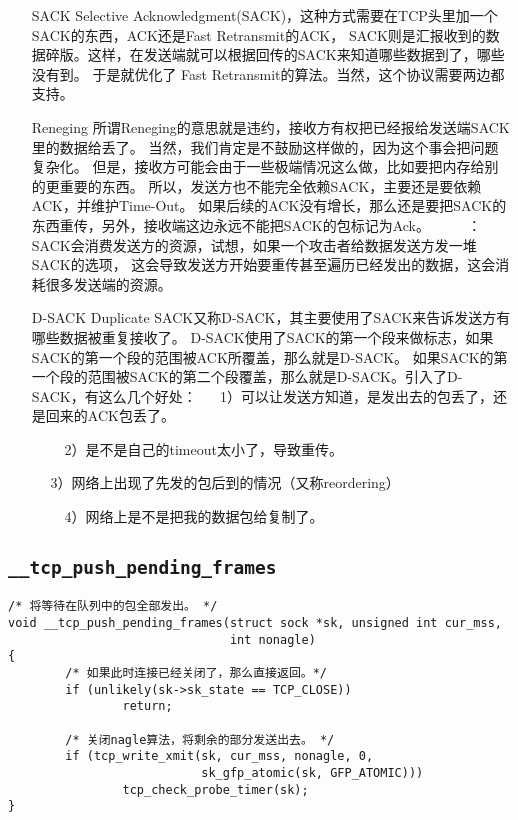 \begin{enumerate}
\item[SACK]			Selective Acknowledgment(SACK)，这种方式需要在TCP头里加一个SACK的东西，ACK还是Fast Retransmit的ACK，
					SACK则是汇报收到的数据碎版。这样，在发送端就可以根据回传的SACK来知道哪些数据到了，哪些没有到。
					于是就优化了 Fast Retransmit的算法。当然，这个协议需要两边都支持。
\item[Reneging]		所谓Reneging的意思就是违约，接收方有权把已经报给发送端SACK里的数据给丢了。
					当然，我们肯定是不鼓励这样做的，因为这个事会把问题复杂化。
					但是，接收方可能会由于一些极端情况这么做，比如要把内存给别的更重要的东西。
					所以，发送方也不能完全依赖SACK，主要还是要依赖ACK，并维护Time-Out。
					如果后续的ACK没有增长，那么还是要把SACK的东西重传，另外，接收端这边永远不能把SACK的包标记为Ack。
　　					\color{red}{注意}：SACK会消费发送方的资源，试想，如果一个攻击者给数据发送方发一堆SACK的选项，
					这会导致发送方开始要重传甚至遍历已经发出的数据，这会消耗很多发送端的资源。

\item[D-SACK]		Duplicate SACK又称D-SACK，其主要使用了SACK来告诉发送方有哪些数据被重复接收了。
					D-SACK使用了SACK的第一个段来做标志，如果SACK的第一个段的范围被ACK所覆盖，那么就是D-SACK。
					如果SACK的第一个段的范围被SACK的第二个段覆盖，那么就是D-SACK。引入了D-SACK，有这么几个好处：
　						1）可以让发送方知道，是发出去的包丢了，还是回来的ACK包丢了。

　　						2）是不是自己的timeout太小了，导致重传。

　						3）网络上出现了先发的包后到的情况（又称reordering）

　　						4）网络上是不是把我的数据包给复制了。
\end{enumerate}

	\subsection{\texttt{__tcp_push_pending_frames}}
\begin{verbatim}
/* 将等待在队列中的包全部发出。 */
void __tcp_push_pending_frames(struct sock *sk, unsigned int cur_mss,
                               int nonagle)
{
        /* 如果此时连接已经关闭了，那么直接返回。*/
        if (unlikely(sk->sk_state == TCP_CLOSE))
                return;

        /* 关闭nagle算法，将剩余的部分发送出去。 */
        if (tcp_write_xmit(sk, cur_mss, nonagle, 0,
                           sk_gfp_atomic(sk, GFP_ATOMIC)))
                tcp_check_probe_timer(sk);
}
\end{verbatim}
